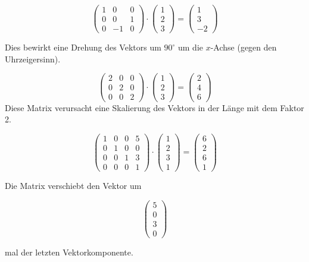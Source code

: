 \documentclass[a4paper]{scrartcl}
\begin{document}
\[
	\begin{pmatrix}
	1 & 0 & 0\\
	0 & 0 & 1 \\
	0 & -1 & 0
	\end{pmatrix}\cdot
	\begin{pmatrix}
	1 \\ 2 \\ 3 
	\end{pmatrix}=
	\begin{pmatrix}
	1 \\ 3 \\ -2
	\end{pmatrix}
\]

Dies bewirkt eine Drehung des Vektors um $90^\circ$ um die $x$-Achse (gegen den Uhrzeigersinn).

\[
	\begin{pmatrix}
	2 & 0 & 0\\
	0 & 2 & 0\\
	0 & 0 & 2
	\end{pmatrix}\cdot
	\begin{pmatrix}
	1 \\ 2 \\ 3 
	\end{pmatrix}=
	\begin{pmatrix}
	2 \\ 4 \\ 6
	\end{pmatrix}
\]
Diese Matrix verursacht eine Skalierung des Vektors in der Länge mit dem Faktor 2.

\[
	\begin{pmatrix}
	1 & 0 & 0 & 5\\
	0 & 1 & 0 & 0\\
	0 & 0 & 1 & 3\\
	0 & 0 & 0 & 1
	\end{pmatrix}\cdot
	\begin{pmatrix}
	1 \\ 2 \\ 3 \\ 1
	\end{pmatrix}=
	\begin{pmatrix}
	6 \\ 2 \\ 6 \\ 1
	\end{pmatrix}
\]

Die Matrix verschiebt den Vektor um

\[
	\begin{pmatrix}
	5 \\ 0 \\ 3 \\ 0
	\end{pmatrix}
\]

mal der letzten Vektorkomponente.
\end{document}
